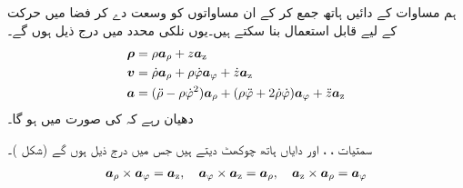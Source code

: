  ہم مساوات  کے دائیں ہاتھ     جمع کر کے ان مساواتوں کو وسعت دے کر  فضا میں حرکت کے لیے  قابل استعمال بنا سکتے ہیں۔یوں نلکی محدد میں درج ذیل ہوں گے۔
\begin{gather}
\begin{aligned}
\kvec{\rho}&=\rho\arho+z\az\\
\kvec{v}&=\dot{\rho}\arho+\rho\dot{\varphi}\avarphi+\dot{z}\az\\
\kvec{a}&=(\ddot{\rho}-\rho\dot{\varphi}^2)\arho+(\rho\ddot{\varphi}+2\dot{\rho}\dot{\varphi})\avarphi+\ddot{z}\az
\end{aligned}
\end{gather}
دھیان رہے کہ  کی صورت میں  ہو گا۔

سمتیات ، ،  اور  دایاں ہاتھ چوکھٹ دیتے ہیں جس میں درج ذیل ہوں گے (شکل )۔
\begin{align}
\arho\times\avarphi=\az,\quad \avarphi\times\az=\arho,\quad \az\times\arho=\avarphi
\end{align}

